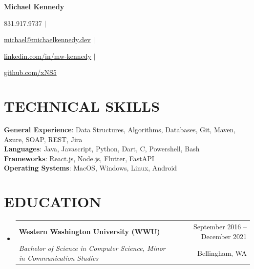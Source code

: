 \documentclass[letterpaper,11pt]{article}
\makeatletter
\newcommand{\resumeSubheading}[4]{
  \vspace{-1pt}\item
    \begin{tabular*}{\textwidth}[t]{l@{\extracolsep{\fill}}r}
      \textbf{#1} & {\color{dark-grey}\small #2}\vspace{1pt}\\ %
      \textit{#3} & {\color{dark-grey} \small #4}\\ %
    \end{tabular*}\vspace{-4pt}
}
\newcommand{\resumeSubHeadingListStart}{\begin{itemize}[leftmargin=0in, label={}]}
\newcommand{\resumeSubHeadingListEnd}{\end{itemize}}
\newif\ifdisablesymbol
\newcommand{\rendericon}[1]{%
    \ifdisablesymbol
    \else
        #1
    \fi
}
\makeatother
\begin{document}

\begin{center}
    \textbf{\Huge Michael Kennedy} \\ \vspace{5pt}
    \small \rendericon{\faPhone} \hspace{2pt} 831.917.9737 \hspace{1pt} $|$
    \hspace{1pt} \rendericon{\faEnvelope} \hspace{2pt} \href{mailto:michael@michaelkennedy.dev}{michael@michaelkennedy.dev} \hspace{1pt} $|$ 
    \hspace{1pt} \rendericon{\faLinkedinSquare} \hspace{2pt} \href{https://www.linkedin.com/in/mw-kennedy}{linkedin.com/in/mw-kennedy} \hspace{1pt}$|$
    \hspace{1pt} \rendericon{\faGithubSquare} \hspace{2pt} \href{https://github.com/xNS5}{github.com/xNS5}
    \\ \vspace{-3pt}
\end{center}

\section{TECHNICAL SKILLS}
 \begin{itemize}[leftmargin=0in, label={}]
    \small{\item{
    \textbf{General Experience}{: Data Structures, Algorithms, Databases, Git, Maven, Azure, SOAP, REST, Jira}\\
     \textbf{Languages}{: Java, Javascript, Python, Dart, C, Powershell, Bash} \\
     \textbf{Frameworks}{: React.js, Node.js, Flutter, FastAPI}\\
     \textbf{Operating Systems}{: MacOS, Windows, Linux, Android}
    }}
 \end{itemize}
 
\section {EDUCATION}
  \resumeSubHeadingListStart
    \resumeSubheading
      {Western Washington University (WWU)}{September 2016 -- December 2021}
      {Bachelor of Science in Computer Science, Minor in Communication Studies}{Bellingham, WA} 
  \resumeSubHeadingListEnd
\end{document}
